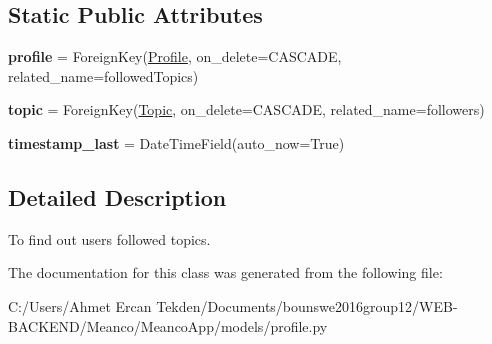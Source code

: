 \subsection*{Static Public Attributes}
\begin{DoxyCompactItemize}
\item 
\hypertarget{class_meanco_app_1_1models_1_1profile_1_1_followed_topic_a8e3f8e5009fdd8c119f399f099fa98b2}{}\label{class_meanco_app_1_1models_1_1profile_1_1_followed_topic_a8e3f8e5009fdd8c119f399f099fa98b2} 
{\bfseries profile} = Foreign\+Key(\hyperlink{class_meanco_app_1_1models_1_1profile_1_1_profile}{Profile}, on\+\_\+delete=C\+A\+S\+C\+A\+DE, related\+\_\+name=\textquotesingle{}followed\+Topics\textquotesingle{})
\item 
\hypertarget{class_meanco_app_1_1models_1_1profile_1_1_followed_topic_a5baddfc8aff41ec3dab3d96d52875d71}{}\label{class_meanco_app_1_1models_1_1profile_1_1_followed_topic_a5baddfc8aff41ec3dab3d96d52875d71} 
{\bfseries topic} = Foreign\+Key(\hyperlink{class_meanco_app_1_1models_1_1topic_1_1_topic}{Topic}, on\+\_\+delete=C\+A\+S\+C\+A\+DE, related\+\_\+name=\textquotesingle{}followers\textquotesingle{})
\item 
\hypertarget{class_meanco_app_1_1models_1_1profile_1_1_followed_topic_a13912b8f5de1d6b87bca8c98b99f45fa}{}\label{class_meanco_app_1_1models_1_1profile_1_1_followed_topic_a13912b8f5de1d6b87bca8c98b99f45fa} 
{\bfseries timestamp\+\_\+last} = Date\+Time\+Field(auto\+\_\+now=True)
\end{DoxyCompactItemize}


\subsection{Detailed Description}
To find out users followed topics. 

The documentation for this class was generated from the following file\+:\begin{DoxyCompactItemize}
\item 
C\+:/\+Users/\+Ahmet Ercan Tekden/\+Documents/bounswe2016group12/\+W\+E\+B-\/\+B\+A\+C\+K\+E\+N\+D/\+Meanco/\+Meanco\+App/models/profile.\+py\end{DoxyCompactItemize}
